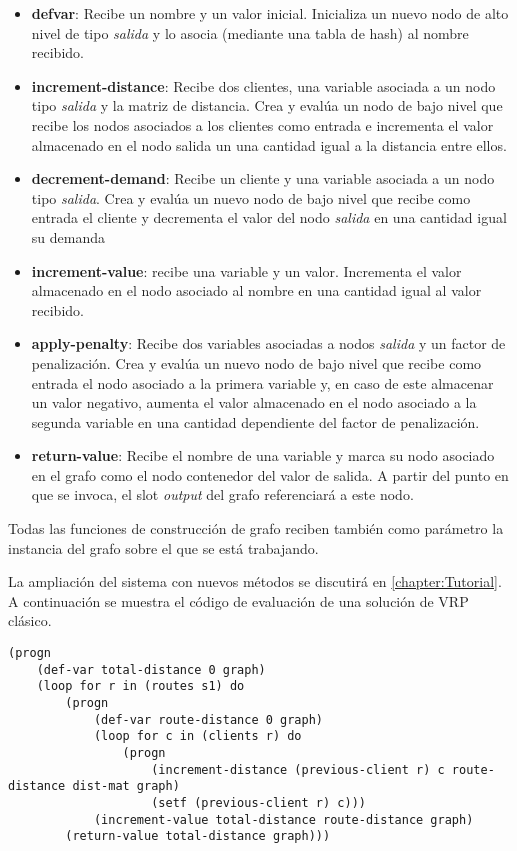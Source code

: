 \begin{itemize}
	\item \textbf{defvar}: Recibe un nombre y un valor inicial. Inicializa un nuevo nodo de alto nivel de tipo \textit{salida} y lo asocia (mediante una tabla de hash) al nombre recibido.	
	\item \textbf{increment-distance}: Recibe dos clientes, una variable asociada a un nodo tipo \textit{salida} y la matriz de distancia. Crea y evalúa un nodo de bajo nivel que recibe los nodos asociados a los clientes como entrada e incrementa el valor almacenado en el nodo salida un una cantidad igual a la distancia entre ellos.
	\item \textbf{decrement-demand}: Recibe un cliente y una variable asociada a un nodo tipo \textit{salida}. Crea y evalúa un nuevo nodo de bajo nivel que recibe como entrada el cliente y decrementa el valor del nodo \textit{salida} en una cantidad igual su demanda
	\item \textbf{increment-value}: recibe una variable y un valor. Incrementa el valor almacenado en el nodo asociado al nombre en una cantidad igual al valor recibido.
	\item \textbf{apply-penalty}: Recibe dos variables asociadas a nodos \textit{salida} y un factor de penalización. Crea y evalúa un nuevo nodo de bajo nivel que recibe como entrada el nodo asociado a la primera variable y, en caso de este almacenar un valor negativo, aumenta el valor almacenado en el nodo asociado a la segunda variable en una cantidad dependiente del factor de penalización.
	\item \textbf{return-value}: Recibe el nombre de una variable y marca su nodo asociado en el grafo como el nodo contenedor del valor de salida. A partir del punto en que se invoca, el slot \textit{output} del grafo referenciará a este nodo.
\end{itemize}

Todas las funciones de construcción de grafo reciben también como parámetro la instancia del grafo sobre el que se está trabajando.

La ampliación del sistema con nuevos métodos se discutirá en \ref{chapter:Tutorial}. A continuación se muestra el código de evaluación de una solución de VRP clásico.


\begin{lstlisting}
(progn
	(def-var total-distance 0 graph)
	(loop for r in (routes s1) do 
		(progn
			(def-var route-distance 0 graph)
			(loop for c in (clients r) do 
				(progn
					(increment-distance (previous-client r) c route-distance dist-mat graph)
					(setf (previous-client r) c)))
			(increment-value total-distance route-distance graph)
		(return-value total-distance graph)))

\end{lstlisting}

